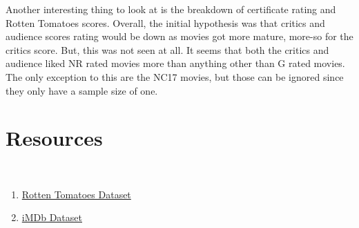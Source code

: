 \documentclass[12pt]{article}
\begin{document}
\noindent Another interesting thing to look at is the breakdown of certificate rating and Rotten Tomatoes scores. Overall, the initial hypothesis was that critics and audience scores rating would be down as movies got more mature, more-so for the critics score. But, this was not seen at all. It seems that both the critics and audience liked NR rated movies more than anything other than G rated movies. The only exception to this are the NC17 movies, but those can be ignored since they only have a sample size of one.

\section{Resources}
\quad \\
\begin{enumerate}
    \item \href{https://brooksemerick.com/s/RottenTomatoes.csv}{Rotten Tomatoes Dataset} \\
    \item \href{https://brooksemerick.com/s/iMDb.csv}{iMDb Dataset}
\end{enumerate}
\end{document}
